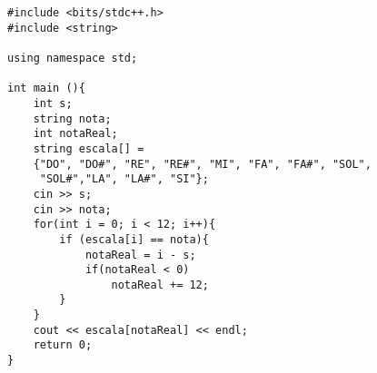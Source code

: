 \begin{verbatim}
#include <bits/stdc++.h>
#include <string>

using namespace std;

int main (){
	int s;
	string nota;
	int notaReal;
	string escala[] =
	{"DO", "DO#", "RE", "RE#", "MI", "FA", "FA#", "SOL",
	 "SOL#","LA", "LA#", "SI"};
	cin >> s;
	cin >> nota;
	for(int i = 0; i < 12; i++){
		if (escala[i] == nota){
			notaReal = i - s;
			if(notaReal < 0)
				notaReal += 12;
		}
	}
	cout << escala[notaReal] << endl;
	return 0;
}
\end{verbatim}
